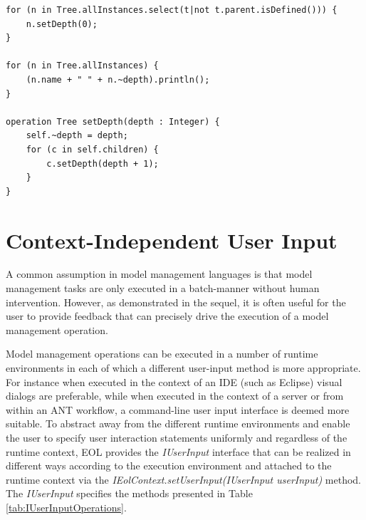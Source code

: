 \begin{lstlisting}[basicstyle=\ttfamily\footnotesize, flexiblecolumns=true, numbers=none, nolol=true, caption=A simplified version of Listing \ref{lst:NoExtendedProperties} using extended properties, label=lst:ExtendedProperties, numbers=left, language=EOL, tabsize=2]
for (n in Tree.allInstances.select(t|not t.parent.isDefined())) {
	n.setDepth(0);
}

for (n in Tree.allInstances) {
	(n.name + " " + n.~depth).println();
}

operation Tree setDepth(depth : Integer) {
	self.~depth = depth;
	for (c in self.children) {
		c.setDepth(depth + 1);
	}
}
\end{lstlisting}


\section{Context-Independent User Input}
\label{sec:Design.EOL.UserInput}

A common assumption in model management languages is that model management tasks are only executed in a batch-manner without human intervention. However, as demonstrated in the sequel, it is often useful for the user to provide feedback that can precisely drive the execution of a model management operation.

Model management operations can be executed in a number of runtime environments in each of which a different user-input method is more appropriate. For instance when executed in the context of an IDE (such as Eclipse) visual dialogs are preferable, while when executed in the context of a server or from within an ANT workflow, a command-line user input interface is deemed more suitable. To abstract away from the different runtime environments and enable the user to specify user interaction statements uniformly and regardless of the runtime context, EOL provides the \emph{IUserInput} interface that can be realized in different ways according to the execution environment and attached to the runtime context via the \emph{IEolContext.setUserInput(IUserInput userInput)} method. The \emph{IUserInput} specifies the methods presented in Table \ref{tab:IUserInputOperations}.

